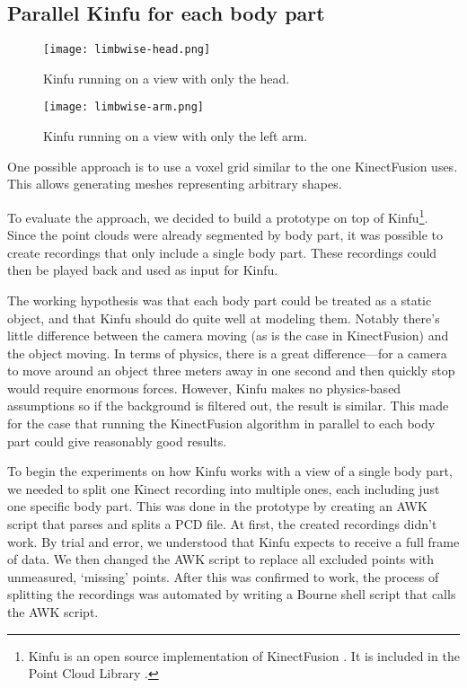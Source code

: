 \subsection{Parallel Kinfu for each body part} \label{voxelgrid}

\begin{figure}
    \centering
    \texttt{[image: limbwise-head.png]}
    \caption{Kinfu running on a view with only the head.}
    \label{fig:limbwise-head}
\end{figure}

\begin{figure}
    \centering
    \texttt{[image: limbwise-arm.png]}
    \caption{Kinfu running on a view with only the left arm.}
    \label{fig:limbwise-arm}
\end{figure}

One possible approach is to use a voxel grid similar to the one KinectFusion \autocites{newcombe2011kinectfusion}{izadi2011kinectfusion} uses. This allows generating meshes representing arbitrary shapes.

To evaluate the approach, we decided to build a prototype on top of Kinfu\footnote{Kinfu is an open source implementation of KinectFusion \citep{newcombe2011kinectfusion}. It is included in the Point Cloud Library \citep{PCL}.}. Since the point clouds were already segmented by body part, it was possible to create recordings that only include a single body part. These recordings could then be played back and used as input for Kinfu.

The working hypothesis was that each body part could be treated as a static object, and that Kinfu should do quite well at modeling them. Notably there's little difference between the camera moving (as is the case in KinectFusion) and the object moving. In terms of physics, there is a great difference---for a camera to move around an object three meters away in one second and then quickly stop would require enormous forces. However, Kinfu makes no physics-based assumptions so if the background is filtered out, the result is similar. This made for the case that running the KinectFusion algorithm in parallel to each body part could give reasonably good results.

To begin the experiments on how Kinfu works with a view of a single body part, we needed to split one Kinect recording into multiple ones, each including just one specific body part. This was done in the prototype by creating an AWK script that parses and splits a PCD file. At first, the created recordings didn't work. By trial and error, we understood that Kinfu expects to receive a full frame of data. We then changed the AWK script to replace all excluded points with unmeasured, `missing' points. After this was confirmed to work, the process of splitting the recordings was automated by writing a Bourne shell script that calls the AWK script.

